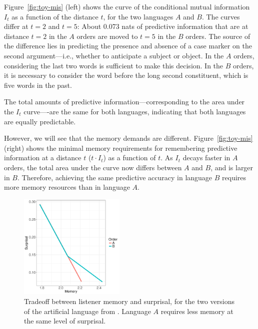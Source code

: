 			Figure~\ref{fig:toy-mis} (left) shows the curve of the conditional mutual information $I_t$ as a function of the distance $t$, for the two languages $A$ and $B$. 
			The curves differ at $t=2$ and $t=5$: 
			About 0.073 nats of predictive information that are at distance $t=2$ in the $A$ orders are moved to $t=5$ in the $B$ orders.
			The source of the difference lies in predicting the presence and absence of a case marker on the second argument---i.e., whether to anticipate a subject or object.
			In the $A$ orders, considering the last two words is sufficient to make this decision.
			In the $B$ orders, it is necessary to consider the word before the long second constituent, which is five words in the past.

			The total amounts of predictive information---corresponding to the area under the $I_t$ curve----are the same for both languages, indicating that both languages are equally predictable.
			
			However, we will see that the memory demands are different.
			Figure~\ref{fig:toy-mis} (right) shows the minimal memory requirements for remembering predictive information at a distance $t$ ($t\cdot I_t$) as a function of $t$.
			As $I_t$ decays faster in $A$ orders, the total area under the curve now differs between $A$ and $B$, and is larger in $B$.
			Therefore, achieving the same predictive accuracy in language $B$ requires more memory resources than in language $A$.


\begin{figure}
\centering
\includegraphics[width=0.45\textwidth]{figures/toy-mem-surp.pdf}
	\caption{Tradeoff between listener memory and surprisal, for the two versions of the artificial language from \cite{fedzechkina-human-2017}. Language $A$ requires less memory at the same level of surprisal.}\label{fig:toy-listener-tradeoff}
\end{figure}

